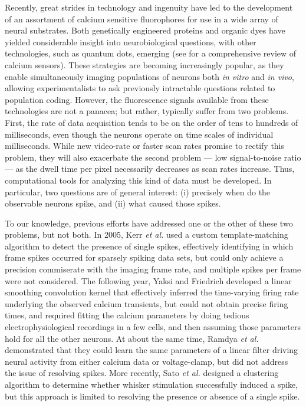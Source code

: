 Recently, great strides in technology and ingenuity have led to the development of an assortment of calcium sensitive fluorophores for use in a wide array of neural substrates\cite{Tsien83, DenkWebb90, MiyawakiTsien97, StosiekKonnerth03, SvobodaYasuda06}.  Both genetically engineered proteins\cite{KleinfeldGriesbeck05} and organic dyes\cite{HelmchenWaters02} have yielded considerable insight into neurobiological questions, with other technologies, such as quantum dots, emerging\cite{SlotkinHaydar07,CuiChu07} (see \cite{GiepmansTsien06} for a comprehensive review of calcium sensors).  These strategies are becoming increasingly popular, as they enable  simultaneously imaging populations of neurons both \emph{in vitro}\cite{IkegayaYuste04} and \emph{in vivo}\cite{NiellSmith05, OhkiReid05, OhkiReid06, YaksiFriedrich07, NagayamaChen07, SatoSvoboda07,RootWang07}, allowing experimentalists to ask previously intractable questions related to population coding.  However, the fluorescence signals available from these technologies are not a panacea; but rather, typically suffer from two problems.  First, the rate of data acquisition tends to be on the order of tens to hundreds of milliseconds\cite{MajewskaYuste00, TsaiKleinfeld02}, even though the neurons operate on time scales of individual milliseconds.  While new video-rate\cite{FanEllisman99, NguyenParker01,RoordaMiesenbock04} or faster\cite{SalomeBourdieu06, IyerSaggau06} scan rates promise to rectify this problem, they will also exacerbate the second problem --- low signal-to-noise ratio --- as the dwell time per pixel necessarily decreases as scan rates increase. Thus, computational tools for analyzing this kind of data must be developed.  In particular, two questions are of general interest: (i) precisely when do the observable neurons spike, and (ii) what caused those spikes.

To our knowledge, previous efforts have addressed one or the other of these two problems, but not both.  In 2005, Kerr \emph{et al.}\cite{KerrHelmchen05} used a custom template-matching algorithm to detect the presence of single spikes, effectively identifying in which frame spikes occurred for sparsely spiking data sets, but could only achieve a precision commiserate with the imaging frame rate, and multiple spikes per frame were not considered. The following year, Yaksi and Friedrich\cite{YaksiFriedrich06} developed a linear smoothing convolution kernel that effectively inferred the time-varying firing rate underlying the observed calcium transients, but could not obtain precise firing times, and required fitting the calcium parameters by doing tedious electrophysiological recordings in a few cells, and then assuming those parameters hold for all the other neurons. At about the same time, Ramdya \emph{et al.}\cite{RamdyaEngert06} demonstrated that they could learn the same parameters of a linear filter driving neural activity from either calcium data or voltage-clamp, but did not address the issue of resolving spikes. More recently, Sato \emph{et al.} designed a clustering algorithm to determine whether whisker stimulation successfully induced a spike, but this approach is limited to resolving the presence or absence of a single spike\cite{SatoSvoboda07}.

